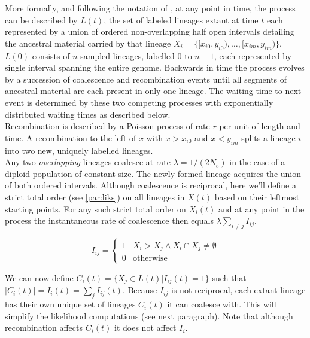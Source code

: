 \documentclass{article}
\begin{document}
More formally, and following the notation of \citet{mcvean_approximating_2005}, at any 
point in time, the process can be described by $L(t)$, the set of labeled lineages 
extant at time $t$ each represented by a union of ordered non-overlapping half open 
intervals detailing the ancestral material 
carried by that lineage $X_i = \{[x_{i0}, y_{i0}), \dotsc, [x_{im}, y_{im})\}$.
$L(0)$ consists of $n$ sampled lineages, labelled $0$ to $n-1$, each represented by 
single interval spanning the entire genome.
Backwards in time the process evolves by a succession of coalescence and recombination 
events until all segments of ancestral material are each present in only one lineage. 
The waiting time to next event is determined by these two competing processes with exponentially 
distributed waiting times as described below.\\

Recombination is described by a Poisson process of rate $r$ per unit of length and time. 
A recombination to the 
left of $x$ with $x>x_{i0}$ and $x<y_{im}$ splits a lineage $i$ into two new, uniquely 
labelled lineages.\\

Any two \emph{overlapping} lineages coalesce at rate $\lambda = 1/(2N_e)$ in the case
of a diploid population of constant size. The newly formed lineage acquires the 
union of both ordered intervals.
Although coalescence is reciprocal, here we'll define a strict total order 
(see \ref{par:liks}) on 
all lineages in $X(t)$ based on their leftmost starting points. 
For any such strict total order on $X_l(t)$ and at any point in the process 
the instantaneous rate of coalescence then equals $\lambda \sum_{i \neq j} I_{ij}$.

\begin{equation} \label{def:coal}
I_{ij} = \begin{cases}
1 & X_i > X_j \wedge X_i \cap X_j \neq \emptyset \\
0 & \text{otherwise}
\end{cases}
\end{equation}

We can now define $C_i(t) = \{X_j \in L(t) | I_{ij}(t) = 1\}$ such that $|C_i(t)| = 
I_{i}(t) = \sum_{j} I_{ij}(t)$.
Because $I_{ij}$ is not reciprocal, each extant lineage has their own unique set of 
lineages $C_i(t)$ it can coalesce with. This will simplify the likelihood computations 
(see next paragraph). Note that although recombination affects $C_i(t)$ it does not 
affect $I_{i}$.\\ 
\end{document}
